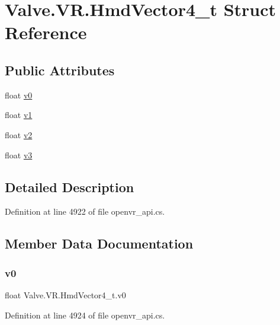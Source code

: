 \hypertarget{struct_valve_1_1_v_r_1_1_hmd_vector4__t}{}\section{Valve.\+V\+R.\+Hmd\+Vector4\+\_\+t Struct Reference}
\label{struct_valve_1_1_v_r_1_1_hmd_vector4__t}
\subsection*{Public Attributes}
\begin{DoxyCompactItemize}
\item 
float \mbox{\hyperlink{struct_valve_1_1_v_r_1_1_hmd_vector4__t_a97fc0dd005f605203ae07b5a37d1d529}{v0}}
\item 
float \mbox{\hyperlink{struct_valve_1_1_v_r_1_1_hmd_vector4__t_a6dc884354795b6fd1c9e5851987235b5}{v1}}
\item 
float \mbox{\hyperlink{struct_valve_1_1_v_r_1_1_hmd_vector4__t_a3a50736d45a40f39e496faa6637ac6c3}{v2}}
\item 
float \mbox{\hyperlink{struct_valve_1_1_v_r_1_1_hmd_vector4__t_a940ee5e07ddd36a4097eb6f917ea271c}{v3}}
\end{DoxyCompactItemize}


\subsection{Detailed Description}


Definition at line 4922 of file openvr\+\_\+api.\+cs.



\subsection{Member Data Documentation}
\mbox{\label{struct_valve_1_1_v_r_1_1_hmd_vector4__t_a97fc0dd005f605203ae07b5a37d1d529}} 
\subsubsection{\texorpdfstring{v0}{v0}}
{\footnotesize\ttfamily float Valve.\+V\+R.\+Hmd\+Vector4\+\_\+t.\+v0}



Definition at line 4924 of file openvr\+\_\+api.\+cs.

